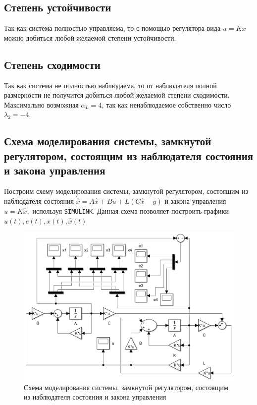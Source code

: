 \documentclass[a4paper, 12pt]{article}
\begin{document}
    
    \subsection{Степень устойчивости}
    Так как система полностью управляема, то с помощью регулятора вида $u=Kx$ можно добиться
    любой желаемой степени устойчивости.


    \subsection{Степень сходимости}
    Так как система не полностью наблюдаема, то от наблюдателя полной размерности не получится
    добиться любой желаемой степени сходимости. Максимально возможная $\alpha_L=4$, так как
    ненаблюдаемое собственно число $\lambda_2=-4$.


    \subsection{Схема моделирования системы, замкнутой регулятором, состоящим из наблюдателя состояния и закона управления}
    Построим схему моделирования системы, замкнутой регулятором, состоящим из наблюдателя состояния
    $\dot{\hat{x}}=A\hat{x}+Bu+L\left( C\hat{x}-y \right)$ и закона управления $u=K\hat{x},$ используя \texttt{SIMULINK}.
    Данная схема позволяет построить графики $u(t),e(t),x(t),\hat{x}(t)$
    \begin{figure}[H]
        \centering
        \includegraphics[scale=0.5]{scheme_task2.png}
        \captionsetup{skip=0pt}
        \caption{Схема моделирования системы, замкнутой регулятором, состоящим из наблюдателя состояния и закона управления}
        \label{fig:scheme_task2}
    \end{figure}
\end{document}
